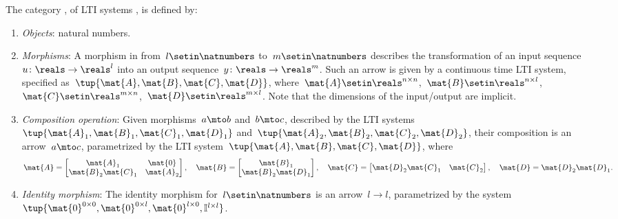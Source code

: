 \begin{ctdefinition}
    \label{def:LTICat}
    The category \LTI, of LTI systems \iindex{\LTI}, is defined by:
    \begin{enumerate}
        \item \emph{Objects}: natural numbers.
        \item \emph{Morphisms}: A morphism in \LTI from~$l\setin \natnumbers$ to~$m\setin \natnumbers$ describes the transformation of an input sequence~$u\colon \reals \to \reals^l$ into an output sequence~$y\colon \reals \to \reals^m$.
              Such an arrow is given by a continuous time LTI system, specified as~$\tup{\mat{A},\mat{B},\mat{C},\mat{D}}$, where~$\mat{A}\setin \reals^{n\times n}$,~$\mat{B}\setin \reals^{n\times l}$,~$\mat{C}\setin \reals^{m\times n}$,~$\mat{D}\setin \reals^{m\times l}$.
              Note that the dimensions of the input/output are implicit.
        \item \emph{Composition operation}: Given morphisms~$a\mto b$ and~$b\mto c$, described by the LTI systems~$\tup{\mat{A}_1,\mat{B}_1,\mat{C}_1,\mat{D}_1}$ and~$\tup{\mat{A}_2,\mat{B}_2,\mat{C}_2,\mat{D}_2}$, their composition is an arrow~$a\mto c$, parametrized by the LTI system~$\tup{\mat{A},\mat{B},\mat{C},\mat{D}}$, where
              \begin{equation}
                  \mat{A}=\begin{bmatrix}
                      \mat{A}_1          & \mat{0}   \\
                      \mat{B}_2\mat{C}_1 & \mat{A}_2
                  \end{bmatrix},\quad
                  \mat{B}=\begin{bmatrix}
                      \mat{B}_1 \\
                      \mat{B}_2\mat{D}_1
                  \end{bmatrix},\quad
                  \mat{C}=\begin{bmatrix}
                      \mat{D}_2\mat{C}_1 & \mat{C}_2
                  \end{bmatrix}, \quad
                  \mat{D}=\mat{D}_2\mat{D}_1.
              \end{equation}
        \item \emph{Identity morphism}: The identity morphism for~$l\setin \natnumbers$ is an arrow~$l\to l$, parametrized by the system~$\tup{\mat{0}^{0\times 0},\mat{0}^{0\times l},\mat{0}^{l\times 0},\mathbb{I}^{l\times l}}$.

    \end{enumerate}
\end{ctdefinition}

